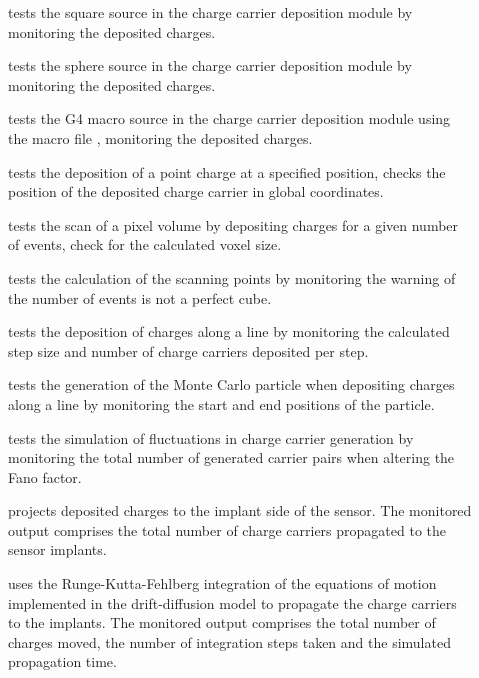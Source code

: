 \begin{description}
    \item[] tests the square source in the charge carrier deposition module by monitoring the deposited charges.
    \item[] tests the sphere source in the charge carrier deposition module by monitoring the deposited charges.
    \item[] tests the G4 macro source in the charge carrier deposition module using the macro file , monitoring the deposited charges.
    \item[] tests the deposition of a point charge at a specified position, checks the position of the deposited charge carrier in global coordinates.
    \item[] tests the scan of a pixel volume by depositing charges for a given number of events, check for the calculated voxel size.
    \item[] tests the calculation of the scanning points by monitoring the warning of the number of events is not a perfect cube.
    \item[] tests the deposition of charges along a line by monitoring the calculated step size and number of charge carriers deposited per step.
    \item[] tests the generation of the Monte Carlo particle when depositing charges along a line by monitoring the start and end positions of the particle.
    \item[] tests the simulation of fluctuations in charge carrier generation by monitoring the total number of generated carrier pairs when altering the Fano factor.
    \item[] projects deposited charges to the implant side of the sensor. The monitored output comprises the total number of charge carriers propagated to the sensor implants.
    \item[] uses the Runge-Kutta-Fehlberg integration of the equations of motion implemented in the drift-diffusion model to propagate the charge carriers to the implants. The monitored output comprises the total number of charges moved, the number of integration steps taken and the simulated propagation time.

\end{description}
